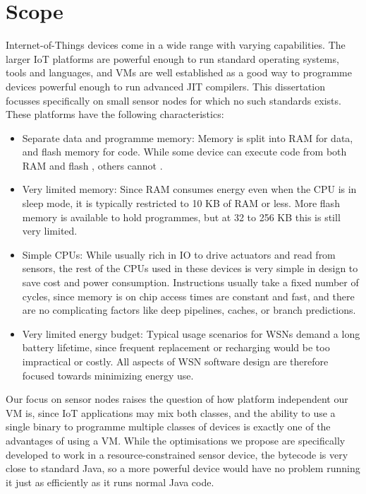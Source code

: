 \section{Scope}
\label{sec-introduction-scope}
Internet-of-Things devices come in a wide range with varying capabilities. The larger IoT platforms are powerful enough to run standard operating systems, tools and languages, and VMs are well established as a good way to programme devices powerful enough to run advanced JIT compilers. This dissertation focusses specifically on small sensor nodes for which no such standards exists. These platforms have the following characteristics:
\begin{itemize}
    \item Separate data and programme memory: Memory is split into RAM for data, and flash memory for code. While some device can execute code from both RAM and flash \cite{TexasInstrumentsIncorporated:MSP430F1611Datasheet}, others cannot \cite{Atmel:ATmega128Datasheet}.
    \item Very limited memory: Since RAM consumes energy even when the CPU is in sleep mode, it is typically restricted to 10 KB of RAM or less. More flash memory is available to hold programmes, but at 32 to 256 KB this is still very limited.
    \item Simple CPUs: While usually rich in IO to drive actuators and read from sensors, the rest of the CPUs used in these devices is very simple in design to save cost and power consumption. Instructions usually take a fixed number of cycles, since memory is on chip access times are constant and fast, and there are no complicating factors like deep pipelines, caches, or branch predictions.
    \item Very limited energy budget: Typical usage scenarios for WSNs demand a long battery lifetime, since frequent replacement or recharging would be too impractical or costly. All aspects of WSN software design are therefore focused towards minimizing energy use.
\end{itemize}

Our focus on sensor nodes raises the question of how platform independent our VM is, since IoT applications may mix both classes, and the ability to use a single binary to programme multiple classes of devices is exactly one of the advantages of using a VM. While the optimisations we propose are specifically developed to work in a resource-constrained sensor device, the bytecode is very close to standard Java, so a more powerful device would have no problem running it just as efficiently as it runs normal Java code.


